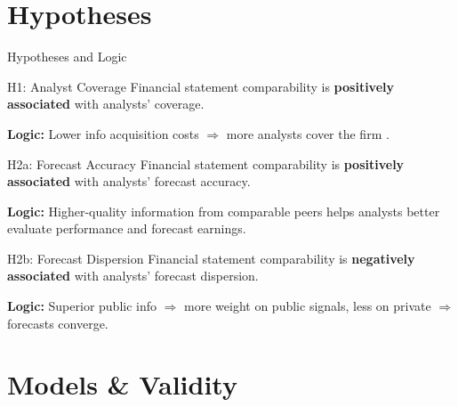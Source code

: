 \documentclass[aspectratio=169,xcolor=dvipsnames]{beamer}
\begin{document}
\section{Hypotheses}

\begin{frame}{Hypotheses and Logic}
    \small
    \begin{block}{H1: Analyst Coverage}
        \small Financial statement comparability is \textbf{positively associated} with analysts' coverage.
    \end{block}
    \vspace{-0.1cm}
    \small\textbf{Logic:} Lower info acquisition costs $\Rightarrow$ more analysts cover the firm \citep{bhushan1989analyst, lang1996corporate}.
    
    \vspace{0.1cm}
    \begin{block}{H2a: Forecast Accuracy}
        \small Financial statement comparability is \textbf{positively associated} with analysts' forecast accuracy.
    \end{block}
    \vspace{-0.1cm}
    \small\textbf{Logic:} Higher-quality information from comparable peers helps analysts better evaluate performance and forecast earnings.
    
    \vspace{0.1cm}
    \begin{block}{H2b: Forecast Dispersion}
        \small Financial statement comparability is \textbf{negatively associated} with analysts' forecast dispersion.
    \end{block}
    \vspace{-0.1cm}
    \small\textbf{Logic:} Superior public info $\Rightarrow$ more weight on public signals, less on private $\Rightarrow$ forecasts converge.
\end{frame}


\section{Models \& Validity}
\end{document}

